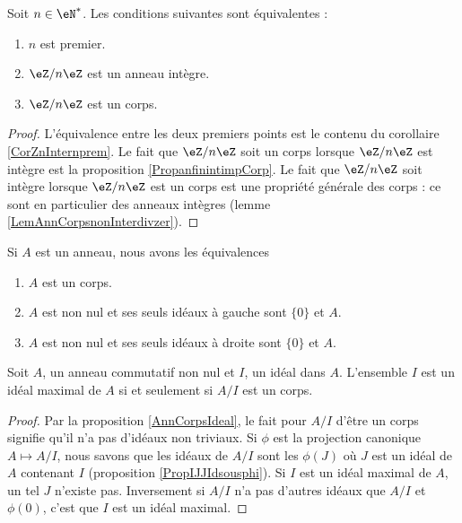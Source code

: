 \begin{proposition}     \label{PropzhFgNJ}
    Soit \( n\in\eN^*\). Les conditions suivantes sont équivalentes :
    \begin{enumerate}
        \item
            \( n\) est premier.
        \item
            \( \eZ/n\eZ\) est un anneau intègre.
        \item
            \( \eZ/n\eZ\) est un corps.
    \end{enumerate}
\end{proposition}

\begin{proof}
    L'équivalence entre les deux premiers points est le contenu du corollaire \ref{CorZnInternprem}. Le fait que \( \eZ/n\eZ\) soit un corps lorsque \( \eZ/n\eZ\) est intègre est la proposition \ref{PropanfinintimpCorp}. Le fait que \( \eZ/n\eZ\) soit intègre lorsque \( \eZ/n\eZ\) est un corps est une propriété générale des corps : ce sont en particulier des anneaux intègres (lemme \ref{LemAnnCorpsnonInterdivzer}).
\end{proof}

\begin{proposition}     \label{AnnCorpsIdeal}
    Si \( A\) est un anneau, nous avons les équivalences
    \begin{enumerate}
        \item
            \( A\) est un corps.
        \item
            \( A\) est non nul et ses seuls idéaux à gauche sont \( \{ 0 \}\) et \( A\).
        \item
            \( A\) est non nul et ses seuls idéaux à droite sont \( \{ 0 \}\) et \( A\).
    \end{enumerate}
\end{proposition}

\begin{proposition}
    Soit \( A\), un anneau commutatif non nul et \( I\), un idéal dans \( A\). L'ensemble \( I\) est un idéal maximal de \( A\) si et seulement si \( A/I\) est un corps.
\end{proposition}

\begin{proof}
    Par la proposition \ref{AnnCorpsIdeal}, le fait pour \( A/I\) d'être un corps signifie qu'il n'a pas d'idéaux non triviaux. Si \( \phi\) est la projection canonique \( A\mapsto A/I\), nous savons que les idéaux de \( A/I\) sont les \( \phi(J)\) où \( J\) est un idéal de \( A\) contenant \( I\) (proposition \ref{PropIJJIdsousphi}). Si \( I\) est un idéal maximal de \( A\), un tel \( J\) n'existe pas. Inversement si \( A/I\) n'a pas d'autres idéaux que \( A/I\) et \( \phi(0)\), c'est que \( I\) est un idéal maximal.
\end{proof}

